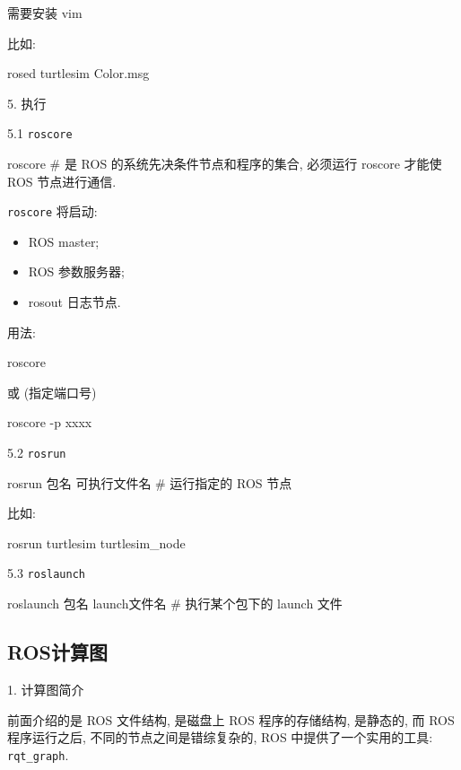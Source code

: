 \documentclass[openany, fontset=windowsold]{ctexbook}
\theoremstyle{kaiti}
\theoremstyle{normal}
\begin{document}
需要安装 vim

比如: 

\begin{bash}
  rosed turtlesim Color.msg
\end{bash}

5. 执行

5.1 \verb|roscore|

\begin{bash}
  roscore # 是 ROS 的系统先决条件节点和程序的集合,  必须运行 roscore 才能使 ROS 节点进行通信.
\end{bash}

\verb|roscore| 将启动:

\begin{itemize}
  \item ROS master;
  \item ROS 参数服务器;
  \item rosout 日志节点.
\end{itemize}

用法:

\begin{bash}
  roscore
\end{bash}
或 (指定端口号)

\begin{bash}
  roscore -p xxxx
\end{bash}

5.2 \verb|rosrun|

\begin{bash}
  rosrun 包名 可执行文件名 # 运行指定的 ROS 节点
\end{bash}

比如:

\begin{bash}
  rosrun turtlesim turtlesim_node
\end{bash}

5.3 \verb|roslaunch|

\begin{bash}
  roslaunch 包名 launch文件名 # 执行某个包下的 launch 文件
\end{bash}

\subsection{ROS计算图}

1. 计算图简介

前面介绍的是 ROS 文件结构, 是磁盘上 ROS 程序的存储结构, 是静态的, 而 ROS 程序运行之后, 不同的节点之间是错综复杂的, ROS 中提供了一个实用的工具: \verb|rqt_graph|.
\end{document}
